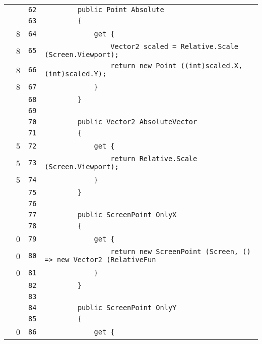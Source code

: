 \documentclass[a4paper,10pt]{article}
\begin{document}
\begin{longtable}[l]{lrrl}
\cellcolor{gray} &  & \verb~62~ & \verb~        public Point Absolute~\\
\cellcolor{gray} &  & \verb~63~ & \verb~        {~\\
\cellcolor{green} & 8 & \verb~64~ & \verb~            get {~\\
\cellcolor{green} & 8 & \verb~65~ & \verb~                Vector2 scaled = Relative.Scale (Screen.Viewport);~\\
\cellcolor{green} & 8 & \verb~66~ & \verb~                return new Point ((int)scaled.X, (int)scaled.Y);~\\
\cellcolor{green} & 8 & \verb~67~ & \verb~            }~\\
\cellcolor{gray} &  & \verb~68~ & \verb~        }~\\
\cellcolor{gray} &  & \verb~69~ & \verb~~\\
\cellcolor{gray} &  & \verb~70~ & \verb~        public Vector2 AbsoluteVector~\\
\cellcolor{gray} &  & \verb~71~ & \verb~        {~\\
\cellcolor{green} & 5 & \verb~72~ & \verb~            get {~\\
\cellcolor{green} & 5 & \verb~73~ & \verb~                return Relative.Scale (Screen.Viewport);~\\
\cellcolor{green} & 5 & \verb~74~ & \verb~            }~\\
\cellcolor{gray} &  & \verb~75~ & \verb~        }~\\
\cellcolor{gray} &  & \verb~76~ & \verb~~\\
\cellcolor{gray} &  & \verb~77~ & \verb~        public ScreenPoint OnlyX~\\
\cellcolor{gray} &  & \verb~78~ & \verb~        {~\\
\cellcolor{red} & 0 & \verb~79~ & \verb~            get {~\\
\cellcolor{red} & 0 & \verb~80~ & \verb~                return new ScreenPoint (Screen, () => new Vector2 (RelativeFun~\\
\cellcolor{red} & 0 & \verb~81~ & \verb~            }~\\
\cellcolor{gray} &  & \verb~82~ & \verb~        }~\\
\cellcolor{gray} &  & \verb~83~ & \verb~~\\
\cellcolor{gray} &  & \verb~84~ & \verb~        public ScreenPoint OnlyY~\\
\cellcolor{gray} &  & \verb~85~ & \verb~        {~\\
\cellcolor{red} & 0 & \verb~86~ & \verb~            get {~\\

\end{longtable}
\end{document}
